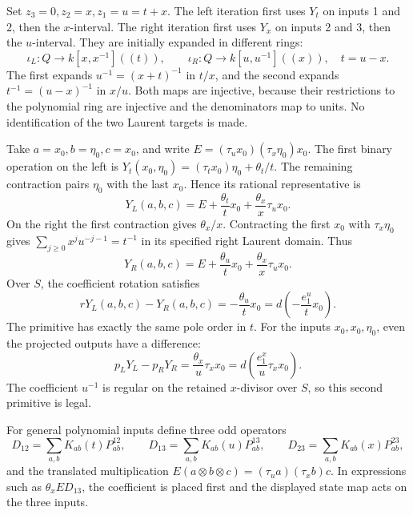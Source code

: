 Set \(z_3=0,z_2=x,z_1=u=t+x\).  The left iteration first
uses \(Y_t\) on inputs 1 and 2, then the \(x\)-interval.
The right iteration first uses \(Y_x\) on inputs 2 and 3,
then the \(u\)-interval.  They are initially expanded in
different rings:
\[
 \iota_L:Q\longrightarrow k[x,x^{-1}]((t)),
 \qquad
 \iota_R:Q\longrightarrow k[u,u^{-1}]((x)),\quad t=u-x.
\]
The first expands \(u^{-1}=(x+t)^{-1}\) in \(t/x\),
and the second expands \(t^{-1}=(u-x)^{-1}\) in \(x/u\).
Both maps are injective, because their restrictions to the
polynomial ring are injective and the denominators map to units.
No identification of the two Laurent targets is made.

\begin{example}
\label{tr:ex:three-states}
Take \(a=x_0,b=\eta_0,c=x_0\), and write
\(E=(\tau_u x_0)(\tau_x\eta_0)x_0\).
The first binary operation on the left is
\(Y_t(x_0,\eta_0)=(\tau_tx_0)\eta_0+\theta_t/t\).
The remaining contraction pairs \(\eta_0\) with the last
\(x_0\).  Hence its rational representative is
\[
 Y_L(a,b,c)=E+\frac{\theta_t}{t}x_0
                +\frac{\theta_x}{x}\tau_ux_0.
\]
On the right the first contraction gives \(\theta_x/x\).
Contracting the first \(x_0\) with \(\tau_x\eta_0\)
gives \(\sum_{j\ge0}x^ju^{-j-1}=t^{-1}\) in its
specified right Laurent domain.  Thus
\[
 Y_R(a,b,c)=E+\frac{\theta_u}{t}x_0
                +\frac{\theta_x}{x}\tau_ux_0.
\]
Over \(S\), the coefficient rotation satisfies
\[
 rY_L(a,b,c)-Y_R(a,b,c)
 =-\frac{\theta_u}{t}x_0
 =d\left(-\frac{e_1^u}{t}x_0\right).
\]
The primitive has exactly the same pole order in \(t\).
For the inputs \(x_0,x_0,\eta_0\), even the projected
outputs have a difference:
\[
 p_LY_L-p_RY_R
 =\frac{\theta_x}{u}\tau_xx_0
 =d\left(\frac{e_1^x}{u}\tau_xx_0\right).
\]
The coefficient \(u^{-1}\) is regular on the retained
\(x\)-divisor over \(S\), so this second primitive is legal.
\end{example}

For general polynomial inputs define three odd operators
\[
 D_{12}=\sum_{a,b}K_{ab}(t)P_{ab}^{12},\qquad
 D_{13}=\sum_{a,b}K_{ab}(u)P_{ab}^{13},\qquad
 D_{23}=\sum_{a,b}K_{ab}(x)P_{ab}^{23},
\]
and the translated multiplication
\(E(a\otimes b\otimes c)=(\tau_ua)(\tau_xb)c\).
In expressions such as \(\theta_x ED_{13}\), the coefficient
is placed first and the displayed state map acts on the three inputs.

